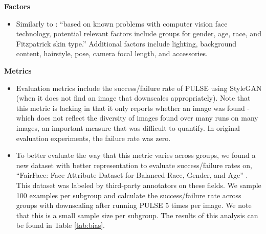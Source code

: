 \documentclass[10pt,twocolumn,letterpaper]{article}
\begin{document}
\begin{figure*}[ht]
\begin{tcolorbox}[
    sharp corners,
    colback=white,
    colframe=black
    ]
\begin{itemize}
\end{itemize}
\textbf{Factors}
\begin{itemize}
    \item Similarly to \cite{modelcards}: ``based on known problems with computer vision face technology, potential relevant factors include groups for gender, age, race, and Fitzpatrick skin type.'' Additional factors include lighting, background content, hairstyle, pose, camera focal length, and accessories.
\end{itemize}
\textbf{Metrics}
\begin{itemize}
    \item Evaluation metrics include the success/failure rate of PULSE using StyleGAN (when it does not find an image that downscales appropriately). Note that this metric is lacking in that it only reports whether an image was found - which does not reflect the diversity of images found over many runs on many images, an important measure that was difficult to quantify. In original evaluation experiments, the failure rate was zero.
    
    \item To better evaluate the way that this metric varies across groups, we found a new dataset with better representation to evaluate success/failure rates on, ``FairFace: Face Attribute Dataset for Balanced Race, Gender, and Age'' \cite{fairface}. This dataset was labeled by third-party annotators on these fields. We sample 100 examples per subgroup and calculate the success/failure rate across groups with  downscaling after running PULSE 5 times per image. We note that this is a small sample size per subgroup. The results of this analysis can be found in Table \ref{tab:bias}.


\end{itemize}
\end{tcolorbox}
\end{figure*}
\end{document}
